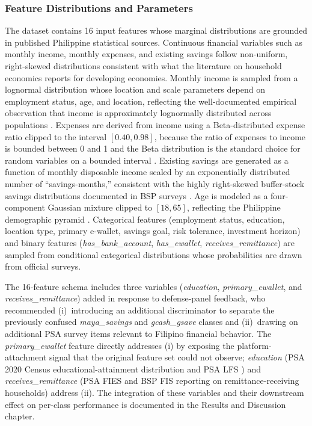 \documentclass{icsthesis}
\begin{document}
\begin{mainmatter}
				\subsubsection{Feature Distributions and Parameters}
					The dataset contains 16 input features whose marginal distributions are grounded in published Philippine statistical sources. Continuous financial variables such as monthly income, monthly expenses, and existing savings follow non-uniform, right-skewed distributions consistent with what the literature on household economics reports for developing economies. Monthly income is sampled from a lognormal distribution whose location and scale parameters depend on employment status, age, and location, reflecting the well-documented empirical observation that income is approximately lognormally distributed across populations \cite{ref54}. Expenses are derived from income using a Beta-distributed expense ratio clipped to the interval $[0.40, 0.98]$, because the ratio of expenses to income is bounded between 0 and 1 and the Beta distribution is the standard choice for random variables on a bounded interval \cite{ref54}. Existing savings are generated as a function of monthly disposable income scaled by an exponentially distributed number of ``savings-months,'' consistent with the highly right-skewed buffer-stock savings distributions documented in BSP surveys \cite{ref35}. Age is modeled as a four-component Gaussian mixture clipped to $[18, 65]$, reflecting the Philippine demographic pyramid \cite{ref39}. Categorical features (employment status, education, location type, primary e-wallet, savings goal, risk tolerance, investment horizon) and binary features (\emph{has\_bank\_account}, \emph{has\_ewallet}, \emph{receives\_remittance}) are sampled from conditional categorical distributions whose probabilities are drawn from official surveys.

					The 16-feature schema includes three variables (\emph{education}, \emph{primary\_ewallet}, and \emph{receives\_remittance}) added in response to defense-panel feedback, who recommended (i)~introducing an additional discriminator to separate the previously confused \emph{maya\_savings} and \emph{gcash\_gsave} classes and (ii)~drawing on additional PSA survey items relevant to Filipino financial behavior. The \emph{primary\_ewallet} feature directly addresses (i) by exposing the platform-attachment signal that the original feature set could not observe; \emph{education} (PSA 2020 Census educational-attainment distribution \cite{ref39} and PSA LFS \cite{ref41}) and \emph{receives\_remittance} (PSA FIES \cite{ref40} and BSP FIS \cite{ref35} reporting on remittance-receiving households) address (ii). The integration of these variables and their downstream effect on per-class performance is documented in the Results and Discussion chapter.


\end{mainmatter}
\end{document}

